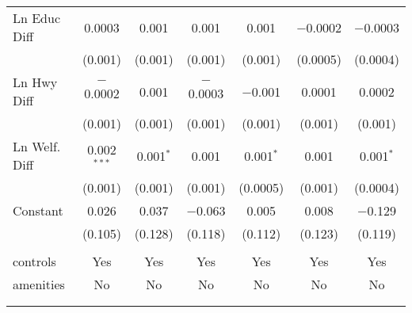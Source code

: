 \begin{table}[!htbp]
\begin{tabular}{@{\extracolsep{5pt}}lcccccc}
  Ln Educ Diff & 0.0003 & 0.001 & 0.001 & 0.001 & $-$0.0002 & $-$0.0003 \\ 
  & (0.001) & (0.001) & (0.001) & (0.001) & (0.0005) & (0.0004) \\ 
  Ln Hwy Diff & $-$0.0002 & 0.001 & $-$0.0003 & $-$0.001 & 0.0001 & 0.0002 \\ 
  & (0.001) & (0.001) & (0.001) & (0.001) & (0.001) & (0.001) \\ 
  Ln Welf. Diff & 0.002$^{***}$ & 0.001$^{*}$ & 0.001 & 0.001$^{*}$ & 0.001 & 0.001$^{*}$ \\ 
  & (0.001) & (0.001) & (0.001) & (0.0005) & (0.001) & (0.0004) \\ 
  Constant & 0.026 & 0.037 & $-$0.063 & 0.005 & 0.008 & $-$0.129 \\ 
  & (0.105) & (0.128) & (0.118) & (0.112) & (0.123) & (0.119) \\ 
 \hline \\[-1.8ex] 
controls & Yes & Yes & Yes & Yes & Yes & Yes \\ 
amenities & No & No & No & No & No & No \\ 
\hline \\[-1.8ex] 
\hline 
\hline \\[-1.8ex] 
\end{tabular} 
\end{table} 
